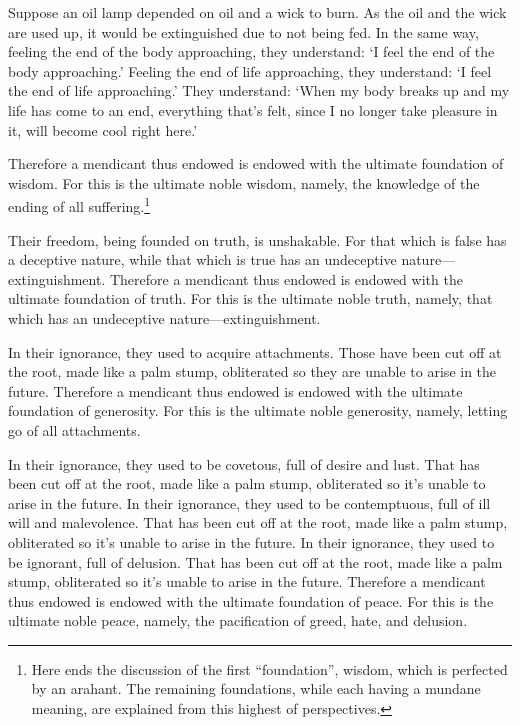 \documentclass[12pt,openany]{book}%
\begin{document}
Suppose an oil lamp depended on oil and a wick to burn. As the oil and the wick are used up, it would be extinguished due to not being fed. In the same way, feeling the end of the body approaching, they understand: ‘I feel the end of the body approaching.’ Feeling the end of life approaching, they understand: ‘I feel the end of life approaching.’ They understand: ‘When my body breaks up and my life has come to an end, everything that’s felt, since I no longer take pleasure in it, will become cool right here.’ 

Therefore a mendicant thus endowed is endowed with the ultimate foundation of wisdom. For this is the ultimate noble wisdom, namely, the knowledge of the ending of all suffering.\footnote{Here ends the discussion of the first “foundation”, wisdom, which is perfected by an arahant. The remaining foundations, while each having a mundane meaning, are explained from this highest of perspectives. } 

Their freedom, being founded on truth, is unshakable. For that which is false has a deceptive nature, while that which is true has an undeceptive nature—extinguishment. Therefore a mendicant thus endowed is endowed with the ultimate foundation of truth. For this is the ultimate noble truth, namely, that which has an undeceptive nature—extinguishment. 

In their ignorance, they used to acquire attachments. Those have been cut off at the root, made like a palm stump, obliterated so they are unable to arise in the future. Therefore a mendicant thus endowed is endowed with the ultimate foundation of generosity. For this is the ultimate noble generosity, namely, letting go of all attachments. 

In their ignorance, they used to be covetous, full of desire and lust. That has been cut off at the root, made like a palm stump, obliterated so it’s unable to arise in the future. In their ignorance, they used to be contemptuous, full of ill will and malevolence. That has been cut off at the root, made like a palm stump, obliterated so it’s unable to arise in the future. In their ignorance, they used to be ignorant, full of delusion. That has been cut off at the root, made like a palm stump, obliterated so it’s unable to arise in the future. Therefore a mendicant thus endowed is endowed with the ultimate foundation of peace. For this is the ultimate noble peace, namely, the pacification of greed, hate, and delusion. 
\end{document}
